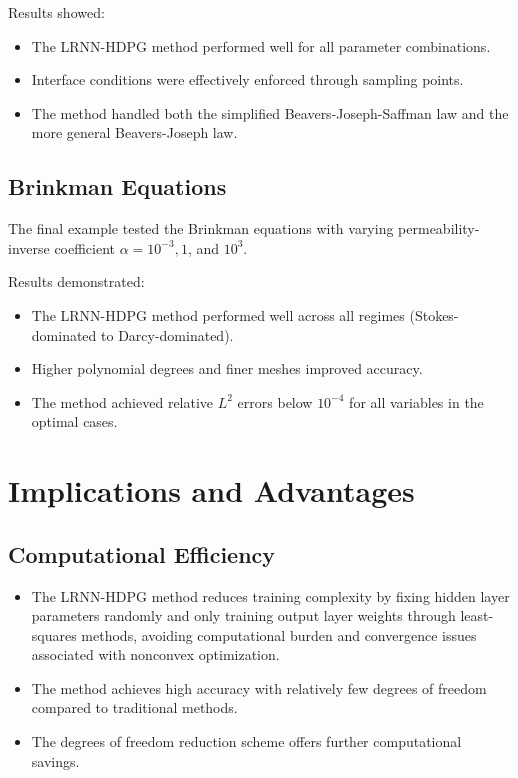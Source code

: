 \documentclass[11pt,a4paper]{article}
\begin{document}
Results showed:
\begin{itemize}
    \item The LRNN-HDPG method performed well for all parameter combinations.
    \item Interface conditions were effectively enforced through sampling points.
    \item The method handled both the simplified Beavers-Joseph-Saffman law and the more general Beavers-Joseph law.
\end{itemize}

\subsection{Brinkman Equations}

The final example tested the Brinkman equations with varying permeability-inverse coefficient $\alpha = 10^{-3}, 1$, and $10^3$.

Results demonstrated:
\begin{itemize}
    \item The LRNN-HDPG method performed well across all regimes (Stokes-dominated to Darcy-dominated).
    \item Higher polynomial degrees and finer meshes improved accuracy.
    \item The method achieved relative $L^2$ errors below $10^{-4}$ for all variables in the optimal cases.
\end{itemize}

\section{Implications and Advantages}

\subsection{Computational Efficiency}

\begin{itemize}
    \item The LRNN-HDPG method reduces training complexity by fixing hidden layer parameters randomly and only training output layer weights through least-squares methods, avoiding computational burden and convergence issues associated with nonconvex optimization.
    \item The method achieves high accuracy with relatively few degrees of freedom compared to traditional methods.
    \item The degrees of freedom reduction scheme offers further computational savings.
\end{itemize}
\end{document}
